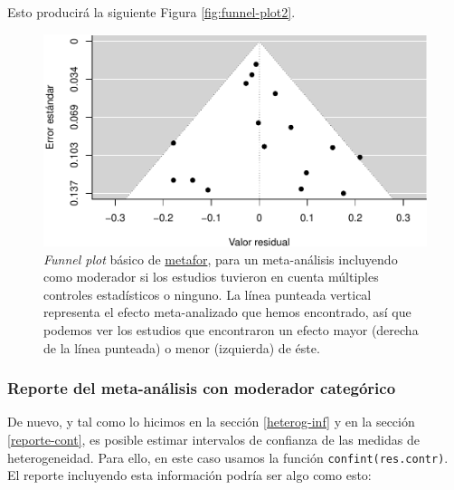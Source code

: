 \documentclass[
  bookmarksnumbered]{article}
\begin{document}
Esto producirá la siguiente Figura \ref{fig:funnel-plot2}.

\begin{figure}
\centering
\includegraphics{Meta-analysis_files/figure-latex/funnel-plot-mod2-1.pdf}
\caption{\label{fig:funnel-plot-mod2}\emph{Funnel plot} básico de \href{https://www.metafor-project.org/doku.php}{metafor}, para un meta-análisis incluyendo como moderador si los estudios tuvieron en cuenta múltiples controles estadísticos o ninguno. La línea punteada vertical representa el efecto meta-analizado que hemos encontrado, así que podemos ver los estudios que encontraron un efecto mayor (derecha de la línea punteada) o menor (izquierda) de éste.}
\end{figure}

\hypertarget{reporte-cat}{%
\subsubsection{Reporte del meta-análisis con moderador categórico}\label{reporte-cat}}

De nuevo, y tal como lo hicimos en la sección \ref{heterog-inf} y en la sección \ref{reporte-cont}, es posible estimar intervalos de confianza de las medidas de heterogeneidad. Para ello, en este caso usamos la función \texttt{confint(res.contr)}. El reporte incluyendo esta información podría ser algo como esto:
\end{document}
